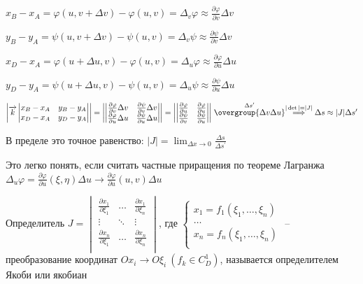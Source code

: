 \documentclass[12pt]{article}
\begin{document}
    $x_B - x_A = \varphi(u, v + \Delta v) - \varphi(u, v) = \Delta_v \varphi \approx \frac{\partial \varphi}{\partial v}\Delta v$

    $y_B - y_A = \psi(u, v + \Delta v) - \psi(u, v) = \Delta_v \psi \approx \frac{\partial \psi}{\partial v}\Delta v$

    $x_D - x_A = \varphi(u + \Delta u, v) - \varphi(u, v) = \Delta_u \varphi \approx \frac{\partial \varphi}{\partial u}\Delta u$

    $y_D - y_A = \psi(u + \Delta u, v) - \psi(u, v) = \Delta_u \psi \approx \frac{\partial \psi}{\partial u}\Delta u$

    $\left| \overrightarrow{k}
    \begin{vmatrix}
        x_B - x_A & y_B - y_A \\
        x_D - x_A & y_D - y_A
    \end{vmatrix}\right| = \left|
    \begin{vmatrix}
        \frac{\partial \varphi}{\partial v}\Delta v & \frac{\partial \psi}{\partial v}\Delta v \\
        \frac{\partial \varphi}{\partial u}\Delta u & \frac{\partial \psi}{\partial u}\Delta u
    \end{vmatrix}\right| = \left|
    \begin{vmatrix}
        \frac{\partial \varphi}{\partial u} & \frac{\partial \varphi}{\partial u} \\
        \frac{\partial \psi}{\partial v}    & \frac{\partial \psi}{\partial u}
    \end{vmatrix}\right| \stackrel{\Delta s^\prime}{\overgroup{\Delta v \Delta u}} \stackrel{|\det| = |J|}{\Longrightarrow} \Delta s \approx |J|\Delta s^\prime$

    \Nota В пределе это точное равенство: $|J| = \lim_{\Delta x \to 0} \frac{\Delta s}{\Delta s^\prime}$

    Это легко понять, если считать частные приращения по теореме Лагранжа $\Delta_u \varphi = \frac{\partial \varphi}{\partial u}(\xi, \eta) \Delta u \rightarrow \frac{\partial \varphi}{\partial u}(u, v) \Delta u$

    \hypertarget{determinantJaсobi}{}

    \Def Определитель $J = \begin{vmatrix}
        \frac{\partial x_1}{\partial \xi_1} & \dots  & \frac{\partial x_1}{\partial \xi_n} \\
        \vdots & \ddots & \vdots \\
        \frac{\partial x_n}{\partial \xi_1} & \dots  & \frac{\partial x_n}{\partial \xi_n} \\
    \end{vmatrix}$, где $\begin{cases}
                             x_1 = f_1(\xi_1, \dots, \xi_n) \\
                             \dots \\
                             x_n = f_n(\xi_1, \dots, \xi_n) \\
    \end{cases}$ -- преобразование координат $Ox_i \to O\xi_i \ (f_k \in C^1_D)$, называется определителем Якоби или якобиан
\end{document}
